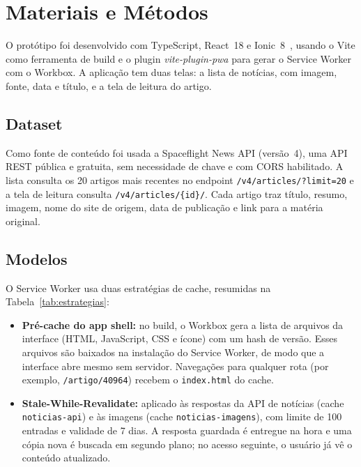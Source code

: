 \documentclass[preprint,10pt,5p]{elsarticle}
\begin{document}

\section{Materiais e Métodos}
\label{methods}

O protótipo foi desenvolvido com TypeScript, React~18 e Ionic~8~\citep{ionic2024}, usando o Vite como ferramenta de build e o plugin \textit{vite-plugin-pwa} para gerar o Service Worker com o Workbox. A aplicação tem duas telas: a lista de notícias, com imagem, fonte, data e título, e a tela de leitura do artigo.

\subsection{Dataset}

Como fonte de conteúdo foi usada a Spaceflight News API (versão~4), uma API REST pública e gratuita, sem necessidade de chave e com CORS habilitado. A lista consulta os 20 artigos mais recentes no endpoint \texttt{/v4/articles/?limit=20} e a tela de leitura consulta \texttt{/v4/articles/\{id\}/}. Cada artigo traz título, resumo, imagem, nome do site de origem, data de publicação e link para a matéria original.

\subsection{Modelos}

O Service Worker usa duas estratégias de cache, resumidas na Tabela~\ref{tab:estrategias}:

\begin{itemize}
  \item \textbf{Pré-cache do app shell:} no build, o Workbox gera a lista de arquivos da interface (HTML, JavaScript, CSS e ícone) com um hash de versão. Esses arquivos são baixados na instalação do Service Worker, de modo que a interface abre mesmo sem servidor. Navegações para qualquer rota (por exemplo, \texttt{/artigo/40964}) recebem o \texttt{index.html} do cache.
  \item \textbf{Stale-While-Revalidate:} aplicado às respostas da API de notícias (cache \texttt{noticias-api}) e às imagens (cache \texttt{noticias-imagens}), com limite de 100 entradas e validade de 7 dias. A resposta guardada é entregue na hora e uma cópia nova é buscada em segundo plano; no acesso seguinte, o usuário já vê o conteúdo atualizado.
\end{itemize}
\end{document}
